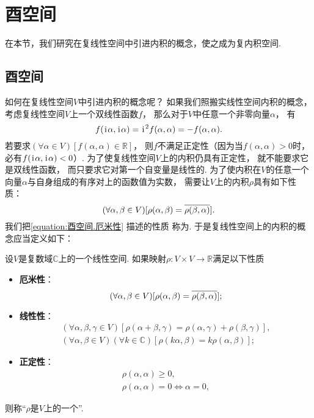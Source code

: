 \section{酉空间}
在本节，我们研究在复线性空间中引进内积的概念，使之成为复内积空间.

\subsection{酉空间}
如何在复线性空间\(V\)中引进内积的概念呢？
如果我们照搬实线性空间内积的概念，
考虑复线性空间\(V\)上一个双线性函数\(f\)，
那么对于\(V\)中任意一个非零向量\(\alpha\)，
有\begin{equation*}
	f(\kern1pt\mathrm{i}\kern1pt\alpha,\kern1pt\mathrm{i}\kern1pt\alpha)
	= \kern1pt\mathrm{i}\kern1pt^2 f(\alpha,\alpha)
	= -f(\alpha,\alpha).
\end{equation*}
若要求\((\forall \alpha \in V)[f(\alpha,\alpha) \in \mathbb{R}]\)，
则\(f\)不满足正定性（因为当\(f(\alpha,\alpha) > 0\)时，必有\(f(\kern1pt\mathrm{i}\kern1pt\alpha,\kern1pt\mathrm{i}\kern1pt\alpha) < 0\)）.
为了使复线性空间\(V\)上的内积仍具有正定性，
就不能要求它是双线性函数，
而只要求它对第一个自变量是线性的.
为了使内积在\(V\)的任意一个向量\(\alpha\)与自身组成的有序对上的函数值为实数，
需要让\(V\)上的内积\(\rho\)具有如下性质：
\begin{equation}\label{equation:酉空间.厄米性}
	(\forall \alpha,\beta \in V)
	[
		\rho(\alpha,\beta)
		= \overline{\rho(\beta,\alpha)}
	].
\end{equation}
我们把\cref{equation:酉空间.厄米性} 描述的性质
称为.
于是复线性空间上的内积的概念应当定义如下：
\begin{definition}
设\(V\)是复数域\(\mathbb{C}\)上的一个线性空间.
如果映射\(\rho\colon V \times V \to \mathbb{R}\)满足以下性质\begin{itemize}
	\item {\rm\bf 厄米性}：\begin{equation*}
		(\forall \alpha,\beta \in V)
		[
			\rho(\alpha,\beta)
			= \overline{\rho(\beta,\alpha)}
		];
	\end{equation*}

	\item {\rm\bf 线性性}：\begin{gather*}
		(\forall \alpha,\beta,\gamma \in V)
		[
			\rho(\alpha+\beta,\gamma)
			= \rho(\alpha,\gamma) + \rho(\beta,\gamma)
		], \\
		(\forall \alpha,\beta \in V)
		(\forall k \in \mathbb{C})
		[
			\rho(k\alpha,\beta)
			= k\rho(\alpha,\beta)
		];
	\end{gather*}

	\item {\rm\bf 正定性}：\begin{gather*}
		\rho(\alpha,\alpha) \geq 0, \\
		\rho(\alpha,\alpha) = 0 \iff \alpha = 0,
	\end{gather*}
\end{itemize}
则称“\(\rho\)是\(V\)上的一个”.
\end{definition}

